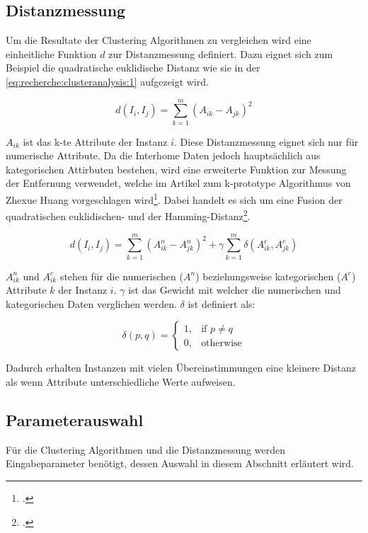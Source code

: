 \subsection{Distanzmessung}
\label{sec:konzept:anwendungderalgorithmen:distanzmessung}
Um die Resultate der Clustering Algorithmen zu vergleichen wird eine einheitliche Funktion $d$ zur Distanzmessung definiert.
Dazu eignet sich zum Beispiel die quadratische euklidische Distanz wie sie in der \cref{eq:recherche:clusteranalysis:1} aufgezeigt wird.

\begin{equation} \label{eq:recherche:clusteranalysis:1}
d(I_i, I_j) = \sum_{k=1}^{m} (A_{ik} - A_{jk})^2
\end{equation}

$A_{ik}$ ist das k-te Attribute der Instanz $i$. 
Diese Distanzmessung eignet sich nur für numerische Attribute.
Da die Interhome Daten jedoch hauptsächlich aus kategorischen Attirbuten bestehen, wird  eine erweiterte Funktion zur Messung der Entfernung verwendet, welche im Artikel zum k-prototype Algorithmus von Zhexue Huang vorgeschlagen wird\footcite{clustering_numeric_and_categorical_values}.
Dabei handelt es sich um eine Fusion der quadratischen euklidischen- und der Hamming-Distanz\footcite{data_mining_concepts_and_techniques}.

\begin{equation} \label{eq:recherche:clusteranalysis:2}
d(I_i, I_j) = \sum_{k=1}^{m} (A^n_{ik} - A^n_{jk})^2 + \gamma \sum_{k=1}^{m} \delta(A^c_{ik}, A^c_{jk})
\end{equation}

$A^n_{ik}$ und $A^c_{ik}$ stehen für die numerischen ($A^n$) beziehungsweise kategorischen ($A^c$) Attribute $k$ der Instanz $i$. 
$\gamma$ ist das Gewicht mit welcher die numerischen und kategorischen Daten verglichen werden.
$\delta$ ist definiert als:

\begin{equation} \label{eq:recherche:clusteranalysis:3}
\delta(p,q)= 
\begin{cases}
1,				& \text{if } p \neq q\\
0,              & \text{otherwise}
\end{cases}
\end{equation}

Dadurch erhalten Instanzen mit vielen Übereinstimmungen eine kleinere Distanz als wenn Attribute unterschiedliche Werte aufweisen.

\subsection{Parameterauswahl}
\label{sec:konzept:parameterauswahl}
Für die Clustering Algorithmen und die Distanzmessung werden Eingabeparameter benötigt, dessen Auswahl in diesem Abschnitt erläutert wird.

